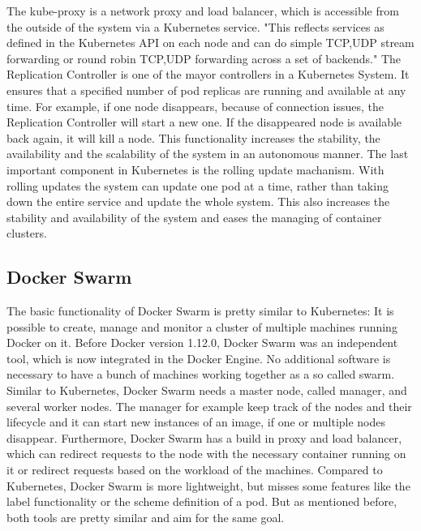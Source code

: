 The kube-proxy is a network proxy and load balancer, which is accessible from the outside of the system via a Kubernetes service.\autocite[cf.][p. 7]{Mulyana:2016}
"This reflects services as defined in the Kubernetes API on each node and can do simple TCP,UDP stream forwarding or round robin TCP,UDP forwarding across a set of backends."\autocite{Kubernetes:kube-proxy:2016}
The Replication Controller is one of the mayor controllers in a Kubernetes System.
It ensures that a specified number of pod replicas are running and available at any time.\autocite[cf.]{Kubernetes:replication-controller:2016}
For example, if one node disappears, because of connection issues, the Replication Controller will start a new one.
If the disappeared node is available back again, it will kill a node.
This functionality increases the stability, the availability and the scalability of the system in an autonomous manner.
The last important component in Kubernetes is the rolling update machanism.
With rolling updates the system can update one pod at a time, rather than taking down the entire service and update the whole system.\autocite[cf.]{Kubernetes:rolling-updates:2016}
This also increases the stability and availability of the system and eases the managing of container clusters.

\subsection{Docker Swarm}
The basic functionality of Docker Swarm is pretty similar to Kubernetes: It is possible to create, manage and monitor a cluster of multiple machines running Docker on it.
Before Docker version 1.12.0, Docker Swarm was an independent tool, which is now integrated in the Docker Engine.\autocite[cf.]{dockerSwarm}
No additional software is necessary to have a bunch of machines working together as a so called swarm.
Similar to Kubernetes, Docker Swarm needs a master node, called manager, and several worker nodes.
The manager for example keep track of the nodes and their lifecycle and it can start new instances of an image, if one or multiple nodes disappear.
Furthermore, Docker Swarm has a build in proxy and load balancer, which can redirect requests to the node with the necessary container running on it or redirect requests based on the workload of the machines.
Compared to Kubernetes, Docker Swarm is more lightweight, but misses some features like the label functionality or the scheme definition of a pod.
But as mentioned before, both tools are pretty similar and aim for the same goal.


